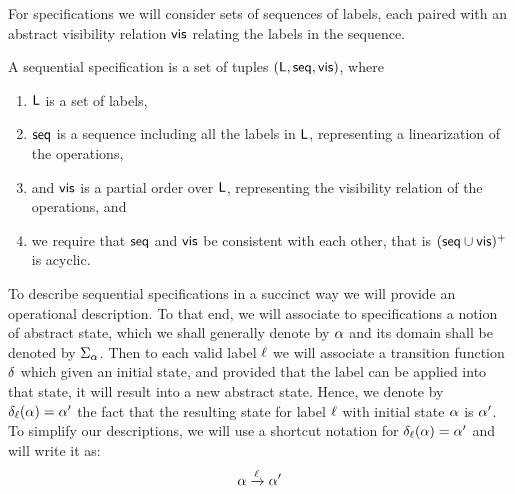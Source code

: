 
For specifications we will consider sets of sequences of labels, each
paired with an abstract visibility relation $\mathsf{vis}$ relating the
labels in the sequence.


\begin{definition}
  \label{definition:sequential specification} A sequential
  specification is a set of tuples $(\mathsf{L}, \mathsf{seq}, \mathsf{vis})$, where
  \begin{enumerate}
  \item $\mathsf{L}$ is a set of labels,
  \item $\mathsf{seq}$ is a sequence including all the labels in $\mathsf{L}$,
    representing a linearization of the operations,
  \item and $\mathsf{vis}$ is a partial order over $\mathsf{L}$,
    representing the visibility relation of the operations, and
  \item we require that $\mathsf{seq}$ and $\mathsf{vis}$ be consistent with
    each other, that is $(\mathsf{seq} \cup \mathsf{vis})^+$ is acyclic.
  \end{enumerate}
\end{definition}

To describe sequential specifications in a succinct way we will
provide an operational description.
To that end, we will associate to specifications a notion of abstract
state, which we shall generally denote by $\alpha$ and its domain
shall be denoted by $\Sigma_{\alpha}$.
Then to each valid label $\ell$ we will associate a transition
function $\delta$ which given an initial state, and provided
that the label can be applied into that state, it will result into a
new abstract state.
Hence, we denote by $\delta_{\ell}(\alpha) = \alpha'$ the fact that
the resulting state for label $\ell$ with initial state $\alpha$
is $\alpha'$.
%
To simplify our descriptions, we will use a shortcut notation for
$\delta_{\ell}(\alpha) = \alpha'$ and will write it as:
\[ \alpha \xrightarrow{\ell}  \alpha' \]

